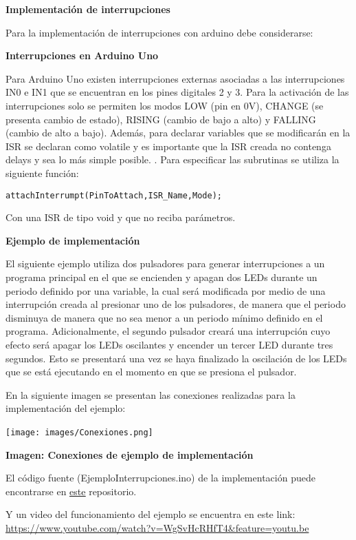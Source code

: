 \documentclass[a4paper,11pt]{article}
\begin{document}
{\large\bfseries Implementación de interrupciones} 

Para la implementación de interrupciones con arduino debe considerarse:

{\large\bfseries Interrupciones en Arduino Uno} 

Para Arduino Uno existen interrupciones externas asociadas a las interrupciones IN0 e IN1 que se encuentran en los pines digitales 2 y 3. Para la activación de las interrupciones solo se permiten los modos LOW (pin en 0V), CHANGE (se presenta cambio de estado), RISING (cambio de bajo a alto) y FALLING (cambio de alto a bajo). Además, para declarar variables que se modificarán en la ISR se declaran como volatile y es importante que la ISR creada no contenga delays y sea lo más simple posible. \cite[p.11-14]{reyes2015arduino}.
Para especificar las subrutinas se utiliza la siguiente función:
\begin{verbatim}attachInterrumpt(PinToAttach,ISR_Name,Mode);\end{verbatim}
Con una ISR de tipo void y que no reciba parámetros.

{\large\bfseries Ejemplo de implementación} 

El siguiente ejemplo utiliza dos pulsadores para generar interrupciones a un programa principal en el que se encienden y apagan dos LEDs durante un periodo definido por una variable, la cual será modificada por medio de una interrupción creada al presionar uno de los pulsadores, de manera que el periodo disminuya de manera que no sea menor a un periodo mínimo definido en el programa.
Adicionalmente, el segundo pulsador creará una interrupción cuyo efecto será apagar los LEDs oscilantes y encender un tercer LED durante tres segundos. Esto se presentará una vez se haya finalizado la oscilación de los LEDs que se está ejecutando en el momento en que se presiona el pulsador.

En la siguiente imagen se presentan las conexiones realizadas para la implementación del ejemplo:

\texttt{[image: images/Conexiones.png]}~

{\large\bfseries Imagen: Conexiones de ejemplo de implementación}

El código fuente (EjemploInterrupciones.ino) de la implementación puede encontrarse en \href{https://github.com/AndreaOspinaHincapie/Informatica2/tree/master/Proyectos%20de%20investigaci%C3%B3n/Interrupciones}{\underline {este}} repositorio.

Y un video del funcionamiento del ejemplo se encuentra en este link:  \url{https://www.youtube.com/watch?v=WgSvHcRHfT4&feature=youtu.be}


\newpage

\renewcommand\refname{REFERENCIAS BIBLIOGRÁFICAS}
%


\end{document}
